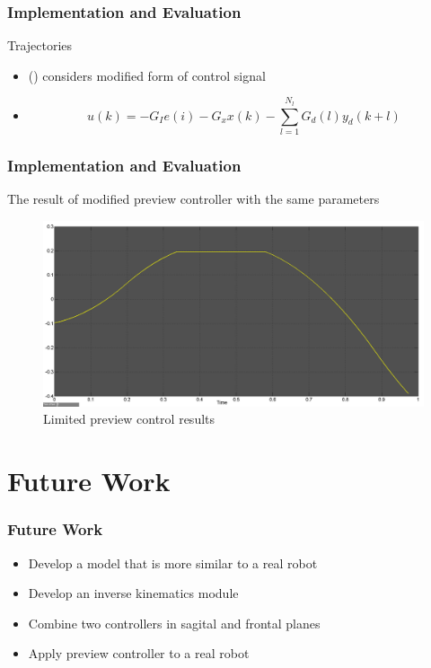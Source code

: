\documentclass{beamer}
\begin{document}

	\begin{frame}
		\frametitle{Implementation and Evaluation}
		\begin{block}{Trajectories}
			\begin{itemize}
				\item
					(\cite{choi2006fuzzy}) considers modified form of control signal
				\item
					\begin{equation}
						u(k) = -G_I e(i) - G_xx(k) - \sum^{N_l}_{l=1}G_d(l)y_d(k+l)
					\end{equation}
			\end{itemize}
		\end{block}
	\end{frame}
	

	\begin{frame}
		\frametitle{Implementation and Evaluation}
		The result of modified preview controller with the same parameters
		
		\begin{figure}[h!]
			\centering
			\includegraphics[width=0.8\linewidth]{presentation_images/30}
			\caption{Limited preview control results}
		\end{figure}
	\end{frame}
	

	\section*{Future Work}
	\begin{frame}
		\frametitle{Future Work}
		\begin{itemize}
			\item
				Develop a model that is more similar to a real robot
			\item
				Develop an inverse kinematics module	
			\item
				Combine two controllers in sagital and frontal planes
			\item
				Apply preview controller to a real robot
		\end{itemize}
	\end{frame}
	
\end{document}
